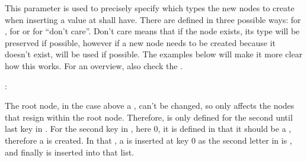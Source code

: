 \documentclass[a4paper,10pt,english]{sphinxmanual}
\begin{document}
\sphinxAtStartPar
This parameter is used to precisely specify which types the new nodes to create when inserting a value at {\hyperref[\detokenize{README:the-path-parameter}]{}} shall have. There are defined in three possible ways:  for ,  for  or  for “don’t care”. Don’t care means that if the node exists, its type will be preserved if possible, however if a new node needs to be created because it doesn’t exist, {\hyperref[\detokenize{README:default-node-type}]{}} will be used if possible. The examples below will make it more clear how this works. For an overview, also check the {\hyperref[\detokenize{README:basic-principles-for-modifying-the-tree}]{}}.

\sphinxAtStartPar
{}:

\begin{sphinxVerbatim}[commandchars=\\\{\},numbers=left,firstnumber=1,stepnumber=1]
  
  
    
\end{sphinxVerbatim}

\sphinxAtStartPar
The root node, in the case above a , can’t be changed, so  only affects the nodes that resign within the root node. Therefore,  is only defined for the second until last key in {\hyperref[\detokenize{README:the-path-parameter}]{}}. For the second key in , here 0, it is defined in  that it should be a , therefore a  is created. In that , a  is inserted at key 0 as the second letter in  is , and finally  is inserted into that \textasciigrave{}list.
\end{document}
